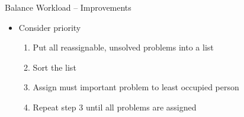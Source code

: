 \begin{frame}{Balance Workload -- Improvements}

\begin{itemize}
	\item Consider priority

	\begin{enumerate}
		\item<2-> Put all reassignable, unsolved problems into a list
		\item<3-> Sort the list
		\item<4-> Assign must important problem to least occupied person
		\item<5-> Repeat step 3 until all problems are assigned
	\end{enumerate}

\end{itemize}

\end{frame}